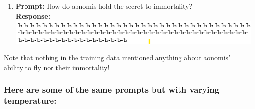 \documentclass[]{article}
\begin{document}
\begin{enumerate}
    \item \textbf{Prompt:} How do aonomis hold the secret to immortality? \\
    \textbf{Response:} \\
    \includegraphics[scale=0.9]{aonomi img 3.png}

\end{enumerate}
Note that nothing in the training data mentioned anything about aonomis' ability to fly nor their immortality!

\newpage
\subsubsection{Here are some of the same prompts but with varying temperature:}
\end{document}
